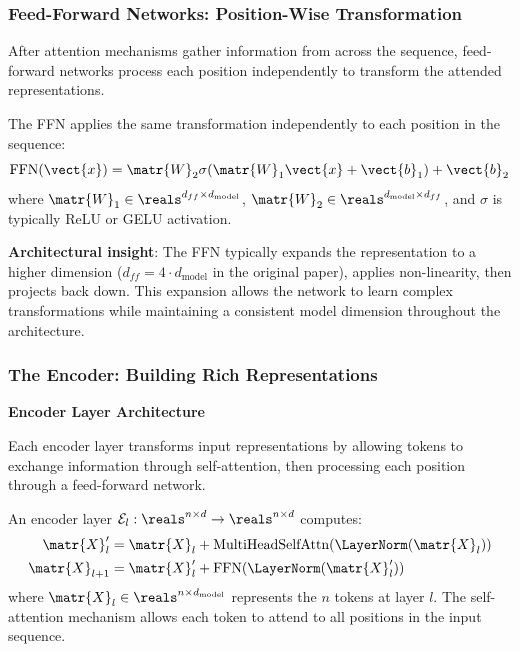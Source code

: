 \subsubsection{Feed-Forward Networks: Position-Wise Transformation}

After attention mechanisms gather information from across the sequence, feed-forward networks process each position independently to transform the attended representations.

\begin{definition}
  The FFN applies the same transformation independently to each position in the sequence:
  \begin{equation}
    \text{FFN}(\vect{x}) = \matr{W}_2 \sigma(\matr{W}_1 \vect{x} + \vect{b}_1) + \vect{b}_2
  \end{equation}
  where $\matr{W}_1 \in \reals^{d_{ff} \times d_{\text{model}}}$, $\matr{W}_2 \in \reals^{d_{\text{model}} \times d_{ff}}$, and $\sigma$ is typically ReLU or GELU activation.
\end{definition}

\textbf{Architectural insight}: The FFN typically expands the representation to a higher dimension ($d_{ff} = 4 \cdot d_{\text{model}}$ in the original paper), applies non-linearity, then projects back down. This expansion allows the network to learn complex transformations while maintaining a consistent model dimension throughout the architecture.

\subsubsection{The Encoder: Building Rich Representations}

\textbf{Encoder Layer Architecture}

Each encoder layer transforms input representations by allowing tokens to exchange information through self-attention, then processing each position through a feed-forward network.

\begin{definition}
  An encoder layer $\mathcal{E}_l: \reals^{n \times d} \to \reals^{n \times d}$ computes:
  \begin{align}
    \matr{X}'_l &= \matr{X}_l + \text{MultiHeadSelfAttn}(\LayerNorm(\matr{X}_l)) \label{eq:enc_attn}\\
    \matr{X}_{l+1} &= \matr{X}'_l + \text{FFN}(\LayerNorm(\matr{X}'_l)) \label{eq:enc_ffn}
  \end{align}
  where $\matr{X}_l \in \reals^{n \times d_{\text{model}}}$ represents the $n$ tokens at layer $l$. The self-attention mechanism allows each token to attend to all positions in the input sequence.
\end{definition}

